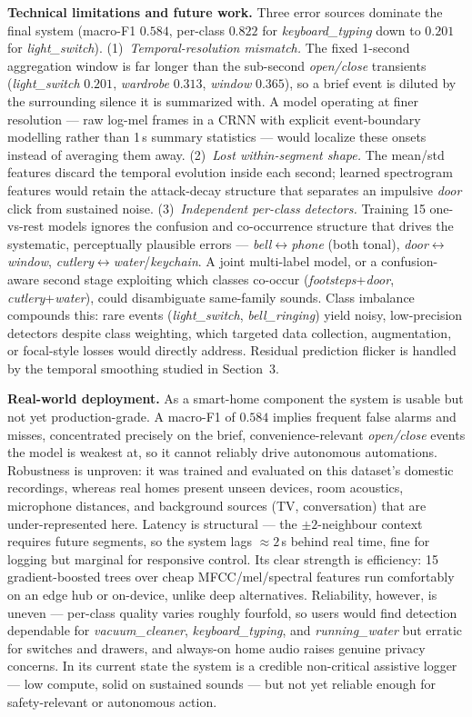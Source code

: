 \documentclass{article}
\begin{document}
\textbf{Technical limitations and future work.} Three error sources dominate the final system (macro-F1 $0.584$, per-class $0.822$ for \emph{keyboard\_typing} down to $0.201$ for \emph{light\_switch}). (1)~\emph{Temporal-resolution mismatch.} The fixed 1-second aggregation window is far longer than the sub-second \emph{open/close} transients (\emph{light\_switch} $0.201$, \emph{wardrobe} $0.313$, \emph{window} $0.365$), so a brief event is diluted by the surrounding silence it is summarized with. A model operating at finer resolution --- raw log-mel frames in a CRNN with explicit event-boundary modelling rather than 1\,s summary statistics --- would localize these onsets instead of averaging them away. (2)~\emph{Lost within-segment shape.} The mean/std features discard the temporal evolution inside each second; learned spectrogram features would retain the attack-decay structure that separates an impulsive \emph{door} click from sustained noise. (3)~\emph{Independent per-class detectors.} Training 15 one-vs-rest models ignores the confusion and co-occurrence structure that drives the systematic, perceptually plausible errors --- \emph{bell}$\leftrightarrow$\emph{phone} (both tonal), \emph{door}$\leftrightarrow$\emph{window}, \emph{cutlery}$\leftrightarrow$\emph{water}/\emph{keychain}. A joint multi-label model, or a confusion-aware second stage exploiting which classes co-occur (\emph{footsteps}+\emph{door}, \emph{cutlery}+\emph{water}), could disambiguate same-family sounds. Class imbalance compounds this: rare events (\emph{light\_switch}, \emph{bell\_ringing}) yield noisy, low-precision detectors despite class weighting, which targeted data collection, augmentation, or focal-style losses would directly address. Residual prediction flicker is handled by the temporal smoothing studied in Section~3.

\textbf{Real-world deployment.} As a smart-home component the system is usable but not yet production-grade. A macro-F1 of $0.584$ implies frequent false alarms and misses, concentrated precisely on the brief, convenience-relevant \emph{open/close} events the model is weakest at, so it cannot reliably drive autonomous automations. Robustness is unproven: it was trained and evaluated on this dataset's domestic recordings, whereas real homes present unseen devices, room acoustics, microphone distances, and background sources (TV, conversation) that are under-represented here. Latency is structural --- the $\pm2$-neighbour context requires future segments, so the system lags $\approx 2$\,s behind real time, fine for logging but marginal for responsive control. Its clear strength is efficiency: 15 gradient-boosted trees over cheap MFCC/mel/spectral features run comfortably on an edge hub or on-device, unlike deep alternatives. Reliability, however, is uneven --- per-class quality varies roughly fourfold, so users would find detection dependable for \emph{vacuum\_cleaner}, \emph{keyboard\_typing}, and \emph{running\_water} but erratic for switches and drawers, and always-on home audio raises genuine privacy concerns. In its current state the system is a credible non-critical assistive logger --- low compute, solid on sustained sounds --- but not yet reliable enough for safety-relevant or autonomous action.
\end{document}
